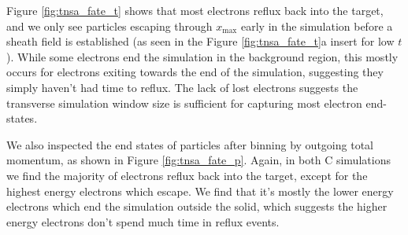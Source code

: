 \documentclass[12pt]{article}
\numberwithin{equation}{section}
\begin{document}
Figure \ref{fig:tnsa_fate_t} shows that most electrons reflux back into the target, and we only see particles escaping through $x_\text{max}$ early in the simulation before a sheath field is established (as seen in the Figure \ref{fig:tnsa_fate_t}a insert for low $t$). While some electrons end the simulation in the background region, this mostly occurs for electrons exiting towards the end of the simulation, suggesting they simply haven't had time to reflux. The lack of lost electrons suggests the transverse simulation window size is sufficient for capturing most electron end-states.

We also inspected the end states of particles after binning by outgoing total momentum, as shown in Figure \ref{fig:tnsa_fate_p}. Again, in both C simulations we find the majority of electrons reflux back into the target, except for the highest energy electrons which escape. We find that it's mostly the lower energy electrons which end the simulation outside the solid, which suggests the higher energy electrons don't spend much time in reflux events.
\end{document}
